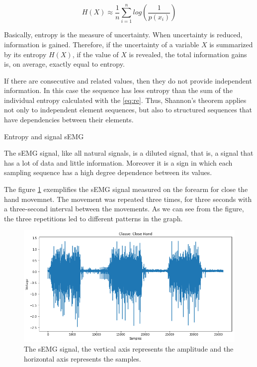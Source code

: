 \documentclass[a4paper, 12pt]{ppgeb}
\makeatletter
\renewcommand{\section}{\@startsection
{section}
{1}
{0mm}
{-\baselineskip}
{0.5\baselineskip}
{\large\bfseries\scshape}}
\makeatother
\begin{document}
\begin{equation} \label{eq:re}
H(X) \approx \frac{1}{n} \sum_{i=1}^{n} log(\frac{1}{p(x_i)})
\end{equation}

Basically, entropy is the measure of uncertainty. When uncertainty is reduced, information is gained. Therefore, if the uncertainty of a variable \(X\) is summarized by its entropy \(H(X)\), if the value of \(X\) is revealed, the total information gains is, on average, exactly equal to entropy.

If there are consecutive and related values, then they do not provide independent information. In this case the sequence has less entropy than the sum of the individual entropy calculated with the \autoref{eq:re}. Thus, Shannon's theorem applies not only to independent element sequences, but also to structured sequences that have dependencies between their elements.

\section{Entropy and signal \ac{sEMG}}

The \ac{sEMG} signal, like all natural signals, is a diluted signal, that is, a signal that has a lot of data and little information. Moreover it is a sign in which each sampling sequence has a high degree dependence between its values.

The figure \ref{fig_semg} exemplifies the \ac{sEMG} signal measured on the forearm for close the hand movemnet. The movement was repeated three times, for three seconds with a three-second interval between the movements. As we can see from the figure, the three repetitions led to different patterns in the graph. 

\begin{figure}[h]
	\centering
	\includegraphics[width=.8\linewidth]{sEMG_signal_close_hand.png}
	\caption{The \ac{sEMG} signal, the vertical axis represents the amplitude and the horizontal axis represents the samples.} \label{fig_semg}
\end{figure}
\end{document}
